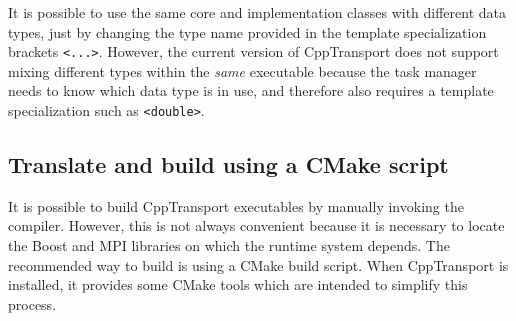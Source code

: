 \documentclass[11pt,a4paper]{article}
\newcounter{advancedbox}[section]
\newenvironment{advanced}[1]{\stepcounter{advancedbox}\begin{tcolorbox}[enhanced,breakable,colback=red!10,colbacktitle=red!20,colframe=red!40,coltitle=black,title={Advanced usage: {#1}},fonttitle=\sffamily\fontseries{b}\selectfont]}{\end{tcolorbox}}
\newcommand{\packagefont}{\sffamily}
\newcommand{\CppTransport}{{\packagefont CppTransport}}
\newcommand{\MPI}{{\packagefont MPI}}
\newcommand{\Boost}{{\packagefont Boost}}
\newcommand{\CMake}{{\packagefont CMake}}
\begin{document}
\begin{advanced}{Custom integration data types}
    It is possible to use the same core and implementation classes with
    different data types, just by changing the type name provided
    in the template specialization brackets
    \texttt{<...>}.
    However, the current version of {\CppTransport} does not support mixing different
    types within the \emph{same} executable because the task manager
    needs to know which data type is in use, and therefore also requires
    a template specialization such as
    \texttt{<double>}.
\end{advanced}

\subsection{Translate and build using a {\CMake} script}
It is possible to build {\CppTransport} executables by manually invoking the
compiler.
However, this
is not always convenient because it is necessary to locate the
{\Boost} and {\MPI}
libraries on which the runtime system depends.
The recommended way to build is using a {\CMake} build script.
When {\CppTransport} is installed, it provides some
{\CMake} tools which are intended to simplify this process.
\end{document}
